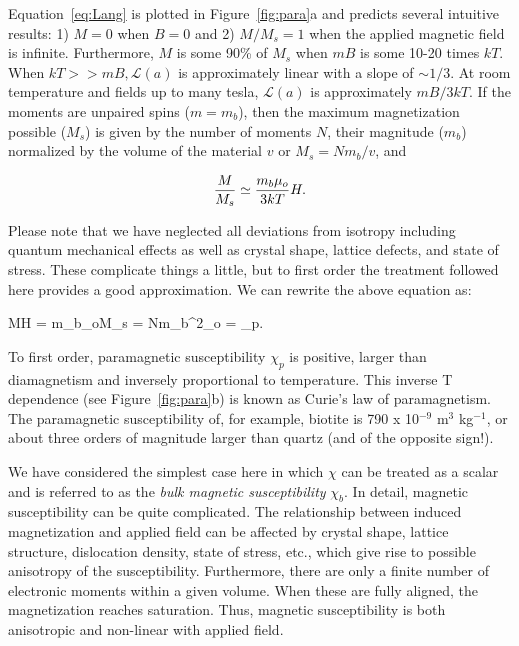 {Equation~\ref{eq:Lang} is plotted in   Figure~\ref{fig:para}a and predicts several intuitive results: 1) $M = 0$ when $B=0$ and 2) $M/M_s = 1$ when the applied  magnetic field is infinite. Furthermore,   $M$  is some 90\% 
of $M_s$ when $mB$ is some 10-20 times $kT$. 
When $kT>> mB, \mathcal{L}(a)$ is approximately linear with a slope of
$\sim 1/3$.  At room temperature and fields up to many tesla, 
$\mathcal{L}(a)$ is approximately $ mB/3kT$. 
%
If the moments  are unpaired spins ($m=m_b$), then the maximum magnetization possible ($M_s$) is given by the number of moments $N$,  their magnitude ($m_b$) normalized by the volume of the material $v$ or  $M_s=Nm_b/v$,
and

$$
{M\over{M_s}} \simeq {
{ m_b \mu_o }\over
{3kT}
}
H .
$$

Please note that we have neglected all deviations from isotropy including quantum
mechanical effects as well as crystal shape, lattice defects, and state
of stress. These complicate things a little, but to first order the treatment followed here provides  a good approximation.  
We can rewrite the above equation as:


\beq
{M\over H} = {{m_b\mu_o}}\cdot M_s =
{{Nm_b^2\mu_o}} = \chi_p.
\eeq

 To first order,
 paramagnetic susceptibility $\chi_p$ is positive, 
larger than diamagnetism and inversely proportional to temperature.
This inverse T dependence (see Figure~\ref{fig:para}b)  is known as 
Curie's law of
paramagnetism.  The paramagnetic susceptibility of, for example, biotite is 790 x 10$^{-9}$ m$^3$ kg$^{-1}$, or about three orders of magnitude larger than quartz (and of the opposite sign!).  


We have considered the simplest case here in which  $\chi$ can be treated as 
a scalar and is referred to as  the
%
{\it bulk magnetic susceptibility} $\chi_b$.
In detail, magnetic susceptibility can be quite complicated. 
The relationship
between induced magnetization and applied field can be
affected by crystal shape, lattice
structure, dislocation density, state of stress, etc., 
which give rise to possible anisotropy of the susceptibility.
Furthermore, there are only a finite number of electronic moments within
a given volume.  When these are fully aligned, the magnetization reaches
saturation.  Thus, magnetic susceptibility is both anisotropic and non-linear
with applied field.

}
